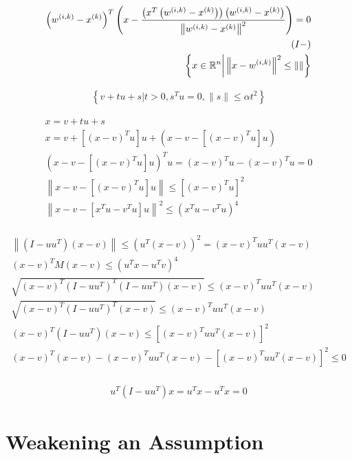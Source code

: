 \begin{align*}
\left({w^{(i, k)}} - x^{(k)}\right)^T \left(x - \frac{\left(x^T\left({w^{(i, k)}} - x^{(k)} \right)\right)\left({w^{(i, k)}} - x^{(k)}\right)}{\left\|{w^{(i, k)}} - x^{(k)}\right\|^2 }\right)= 0 \\
\left(I - \right) \\
\left\{x \in \mathbb R^n \bigg | \left\|x - {w^{(i, k)}} \right\|^2 \le \left\|\right\| \right\}
\end{align*}


\begin{align*}
\left\{v + tu + s \bigg |  t > 0, s^Tu = 0, \|s\| \le \alpha t^2 \right\}
\end{align*}


\begin{align*}
x = v + tu + s \\
x = v + \left[(x - v)^Tu\right] u + \left(x- v - \left[(x - v)^Tu\right] u\right) \\
\left(x- v - \left[(x - v)^Tu\right] u\right)^T u = \left(x - v\right)^Tu - (x - v)^Tu = 0 \\
\left\|  x- v - \left[(x - v)^Tu\right] u\right\| \le \left[(x - v)^Tu\right]^2 \\
\left\|  x- v - \left[x^Tu - v^Tu\right] u\right\|^2 \le \left(x^Tu - v^Tu\right)^4 \\
\end{align*}


\begin{align*}
\left\| \left(I - uu^T\right)(x-v) \right\| \le \left(u^T(x-v)\right)^2 = (x-v)^Tuu^T(x-v)\\
(x - v)^T M (x - v) \le (u^Tx - u^Tv)^4 \\
\sqrt{(x-v)^T\left(I - uu^T\right)^T\left(I - uu^T\right)(x-v)} \le (x-v)^Tuu^T(x-v)\\
\sqrt{(x-v)^T\left(I - uu^T\right)^T(x-v)} \le (x-v)^Tuu^T(x-v)\\
(x-v)^T\left(I - uu^T\right)(x-v) \le \left[(x-v)^Tuu^T(x-v)\right]^2\\
(x-v)^T(x-v) - (x-v)^Tuu^T(x-v) - \left[(x-v)^Tuu^T(x-v)\right]^2 \le 0\\
\end{align*}


\begin{align*}
u^T \left(I - uu^T\right)x = u^Tx - u^Tx = 0
\end{align*}


\section{Weakening an Assumption}
\label{alternative_assumptions_section}

